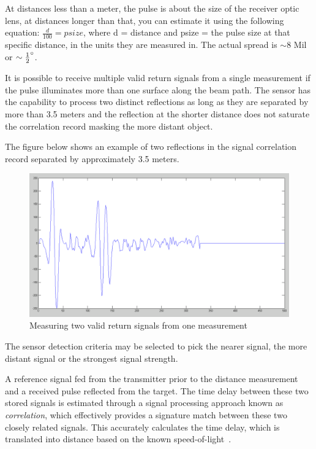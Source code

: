 At distances less than a meter, the pulse is about the size of the receiver optic lens, at distances longer than that, you can estimate it using the following equation: $\frac{d}{100} = psize$, where d = distance and psize = the pulse size at that specific distance, in the units they are measured in. The actual spread is $\sim 8$ Mil or $\sim\frac{1}{2}\degree$\cite{spreadofbeam}.

It is possible to receive multiple valid return signals from a single measurement if the pulse illuminates more than one surface along the beam path. The sensor has the capability to process two distinct reflections as long as they are separated by more than 3.5 meters and the reflection at the shorter distance does not saturate the correlation record masking the more distant object. 

The figure below shows an example of two reflections in the signal correlation record separated by approximately 3.5 meters.

\begin{figure}[H]
	\centering
	\includegraphics[scale=.2]{images/tworeflection.png}
	\caption{Measuring two valid return signals from one measurement~\cite{howtopulse}}
	\label{fig:tworeflections}
\end{figure}

The sensor detection criteria may be selected to pick the nearer signal, the more distant signal or the strongest signal strength.

A reference signal fed from the transmitter prior to the distance measurement and a received pulse reflected from the target.%
 The time delay between these two stored signals is estimated through a signal processing approach known as \textit{correlation}, which effectively provides a signature match between these two closely related signals. This accurately calculates the time delay, which is translated into distance based on the known speed-of-light~\cite{howtopulse}.

